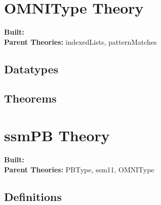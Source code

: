 \documentclass[11pt, twoside]{article}
\begin{document}




\tableofcontents
\cleardoublepage
\HOLpagestyle

\section{OMNIType Theory}
\begin{flushleft}
\textbf{Built:} \HOLOMNITypeDate \\[2pt]
\textbf{Parent Theories:} indexedLists, patternMatches
\end{flushleft}

\subsection{Datatypes}

\HOLOMNITypeDatatypes


\subsection{Theorems}

\HOLOMNITypeTheorems

\section{ssmPB Theory}
\begin{flushleft}
\textbf{Built:} \HOLssmPBDate \\[2pt]
\textbf{Parent Theories:} PBType, ssm11, OMNIType
\end{flushleft}


\subsection{Definitions}
\end{document}
